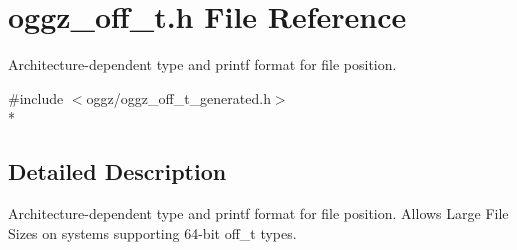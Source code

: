 \section{oggz\-\_\-off\-\_\-t.\-h File Reference}
\label{oggz__off__t_8h}


Architecture-\/dependent type and printf format for file position.  


{\ttfamily \#include $<$oggz/oggz\-\_\-off\-\_\-t\-\_\-generated.\-h$>$}\\*


\subsection{Detailed Description}
Architecture-\/dependent type and printf format for file position. Allows Large File Sizes on systems supporting 64-\/bit off\-\_\-t types. 